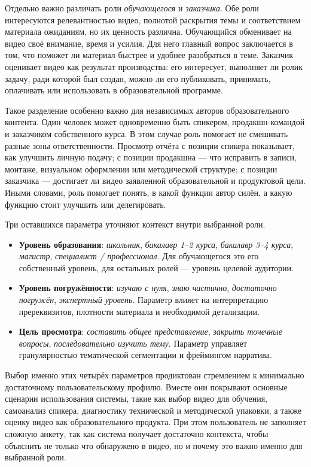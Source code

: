 Отдельно важно различать роли \textit{обучающегося} и \textit{заказчика}.
Обе роли интересуются релевантностью видео, полнотой раскрытия темы и
соответствием материала ожиданиям, но их ценность различна. Обучающийся
обменивает на видео своё внимание, время и усилия. Для него главный вопрос заключается в том, что 
поможет ли материал быстрее и удобнее разобраться в теме. Заказчик оценивает
видео как результат производства: его интересует, выполняет ли ролик задачу,
ради которой был создан, можно ли его публиковать, принимать, оплачивать
или использовать в образовательной программе.

Такое разделение особенно важно для независимых авторов образовательного
контента. Один человек может одновременно быть спикером, продакшн-командой
и заказчиком собственного курса. В этом случае роль помогает не смешивать
разные зоны ответственности. Просмотр отчёта с позиции спикера показывает,
как улучшить личную подачу; с позиции продакшна — что исправить в записи,
монтаже, визуальном оформлении или методической структуре; с позиции
заказчика — достигает ли видео заявленной образовательной и продуктовой цели.
Иными словами, роль помогает понять, в какой функции автор силён, а какую
функцию стоит улучшить или делегировать.

Три оставшихся параметра уточняют контекст внутри выбранной роли.

\begin{itemize}
    \item \textbf{Уровень образования}: \textit{школьник},
    \textit{бакалавр 1--2 курса}, \textit{бакалавр 3--4 курса},
    \textit{магистр}, \textit{специалист / профессионал}.
    Для обучающегося это его собственный уровень, для остальных ролей —
    уровень целевой аудитории.

    \item \textbf{Уровень погружённости}: \textit{изучаю с нуля},
    \textit{знаю частично}, \textit{достаточно погружён},
    \textit{экспертный уровень}. Параметр влияет на интерпретацию
    пререквизитов, плотности материала и необходимой детализации.

    \item \textbf{Цель просмотра}: \textit{составить общее представление},
    \textit{закрыть точечные вопросы}, \textit{последовательно изучить тему}.
    Параметр управляет гранулярностью тематической сегментации
    и фреймингом нарратива.
\end{itemize}

Выбор именно этих четырёх параметров продиктован стремлением к минимально
достаточному пользовательскому профилю. Вместе они покрывают основные
сценарии использования системы, такие как выбор видео для обучения, самоанализ спикера,
диагностику технической и методической упаковки, а также оценку видео как
образовательного продукта. При этом пользователь не заполняет сложную анкету, так как
система получает достаточно контекста, чтобы объяснить не только что обнаружено
в видео, но и почему это важно именно для выбранной роли.


